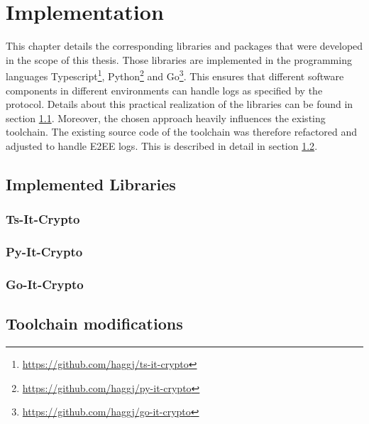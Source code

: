 \documentclass[../main.tex]{subfiles}
\begin{document}
\chapter{Implementation}
\label{chap:design}

This chapter details the corresponding libraries and packages that were developed in the scope of this thesis.
Those libraries are implemented in the programming languages Typescript\footnote{\url{https://github.com/haggj/ts-it-crypto}}, Python\footnote{\url{https://github.com/haggj/py-it-crypto}} and Go\footnote{\url{https://github.com/haggj/go-it-crypto}}.
This ensures that different software components in different environments can handle logs as specified by the protocol.
Details about this practical realization of the libraries can be found in section \ref{sec:implemented-libraries}.
Moreover, the chosen approach heavily influences the existing toolchain.
The existing source code of the toolchain was therefore refactored and adjusted to handle E2EE logs.
This is described in detail in section \ref{sec:toolchain-modifications}.

\section{Implemented Libraries}
\label{sec:implemented-libraries}

\subsection{Ts-It-Crypto}

\subsection{Py-It-Crypto}

\subsection{Go-It-Crypto}

\section{Toolchain modifications}
\label{sec:toolchain-modifications}
\end{document}
